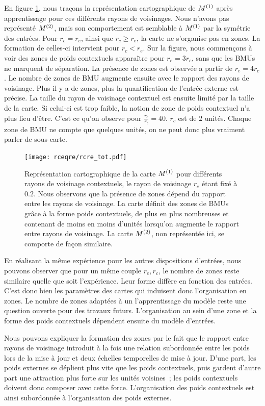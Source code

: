 \documentclass[../main]{subfiles}
\begin{document}
En figure \ref{fig:rcre}, nous traçons la représentation cartographique de $M^{({1})}$ après apprentissage pour ces différents rayons de voisinages.  Nous n'avons pas représenté $M^{({2})}$, mais son comportement est semblable à $M^{({1})}$ par la symétrie des entrées.
Pour $r_c = r_e$, ainsi que $r_c \geq r_e$, la carte ne s'organise pas en zones. 
La formation de celles-ci intervient pour $r_c < r_e$. Sur la figure, nous commençons à voir des zones de poids contextuels apparaître pour $r_e = 3r_c$, sans que les BMUs ne marquent de séparation. La présence de zones est observée a partir de $r_e = 4r_c$.
Le nombre de zones de BMU augmente ensuite avec le rapport des rayons de voisinage. Plus il y a de zones, plus la quantification de l'entrée externe est précise.
La taille du rayon de voisinage contextuel est ensuite limité par la taille de la carte. Si celui-ci est trop faible, la notion de zone de poids contextuel n'a plus lieu d'être. C'est ce qu'on observe pour $\frac{r_e}{r_c} = 40$. $r_c$ est de $2$ unités. Chaque zone de BMU ne compte que quelques unités, on ne peut donc plus vraiment parler de sous-carte.

\begin{figure}[H]
	\texttt{[image: rceqre/rcre\_tot.pdf]}
	\caption{Représentation cartographique de la carte $M^{({1})}$ pour différents rayons de voisinage contextuels, le rayon de voisinage $r_e$ étant fixé à $0.2$. Nous observons que la présence de zones dépend du rapport entre les rayons de voisinage. La carte définit des zones de BMUs grâce à la forme poids contextuels, de plus en plus nombreuses et contenant de moins en moins d'unités lorsqu'on augmente le rapport entre rayons de voisinage.
	La carte $M^{({2})}$, non représentée ici, se comporte de façon similaire.\label{fig:rcre}
	}
\end{figure}	

En réalisant la même expérience pour les autres dispositions d'entrées, nous pouvons observer que pour un même couple $r_e,r_c$, le nombre de zones reste similaire quelle que soit l'expérience. Leur forme diffère en fonction des entrées.
C'est donc bien les paramètres des cartes qui induisent donc l'organisation en zones. Le nombre de zones adaptées à un l'apprentissage du modèle reste une question ouverte pour des travaux futurs.
L'organisation au sein d'une zone et la forme des poids contextuels dépendent ensuite du modèle d'entrées.

Nous pouvons expliquer la formation des zones par le fait que le rapport entre rayons de voisinage introduit à la fois une relation subordonnée entre les poids lors de la mise à jour et deux échelles temporelles de mise à jour. 
D'une part, les poids externes se déplient plus vite que les poids contextuels, puis gardent d'autre part une \og attraction \fg{} plus forte sur les unités voisines~; les poids contextuels doivent donc composer avec cette force. L'organisation des poids contextuels est ainsi subordonnée à l'organisation des poids externes.
\end{document}
